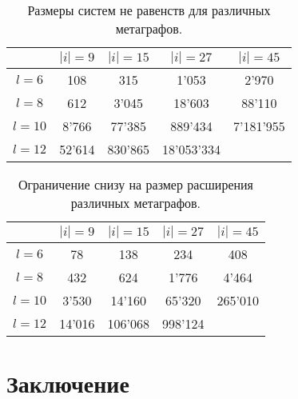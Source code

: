\documentclass[14pt]{mmcs-article}
\begin{document}
\begin{table}[H]
    \centering
    \begin{tabular}{ | c | c | c | c | c | }
        \hline
                   & $|i| = 9$         & $|i| = 15$        & $|i| = 27$      & $|i| = 45$  \\ \hline
        $ l = 6 $  & 108               & 315               & 1'053           & 2'970       \\ \hline
        $ l = 8 $  & 612               & 3'045             & 18'603          & 88'110      \\ \hline
        $ l = 10 $ & 8'766             & 77'385            & 889'434         & 7'181'955   \\ \hline
        $ l = 12 $ & 52'614            & 830'865           & 18'053'334      &             \\ \hline
    \end{tabular}
    \caption{ Размеры систем не равенств для различных метаграфов. }
    \label{experiment_label_count_table}
\end{table}

\begin{table}[H]
    \centering
    \begin{tabular}{ | c | c | c | c | c | }
        \hline
                   & $|i| = 9$         & $|i| = 15$        & $|i| = 27$      & $|i| = 45$  \\ \hline
        $ l = 6 $  & 78                & 138               & 234             & 408         \\ \hline
        $ l = 8 $  & 432               & 624               & 1'776           & 4'464       \\ \hline
        $ l = 10 $ & 3'530             & 14'160            & 65'320          & 265'010     \\ \hline
        $ l = 12 $ & 14'016            & 106'068           & 998'124         &             \\ \hline
    \end{tabular}
    \caption{ Ограничение снизу на размер расширения различных метаграфов. }
    \label{cycle_search_table}
\end{table}

\newpage

\section*{Заключение}
\end{document}
